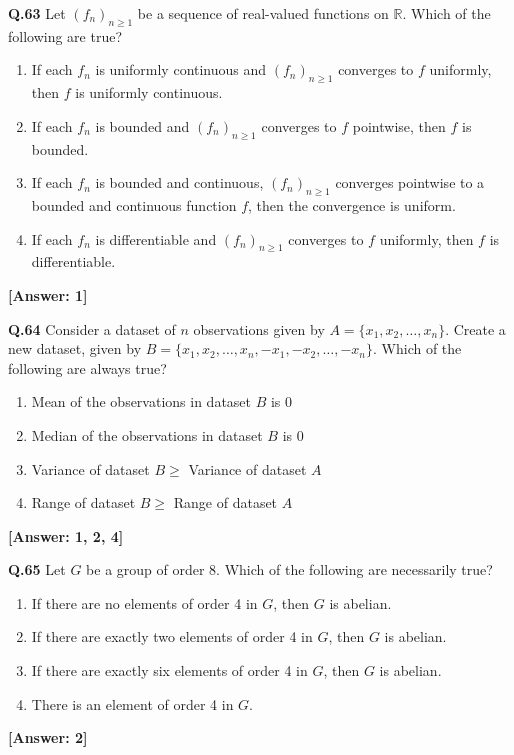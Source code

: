 \documentclass[12pt,a4paper]{article}
\newcommand{\ans}[1]{\quad\textcolor{anscolor}{\textbf{[Answer: #1]}}}
\begin{document}
\textbf{Q.63} Let $(f_n)_{n\ge1}$ be a sequence of real-valued functions on $\mathbb{R}$. Which of the following are true?
\begin{enumerate}[label=\arabic*.]
\item If each $f_n$ is uniformly continuous and $(f_n)_{n\ge1}$ converges to $f$ uniformly, then $f$ is uniformly continuous.
\item If each $f_n$ is bounded and $(f_n)_{n\ge1}$ converges to $f$ pointwise, then $f$ is bounded.
\item If each $f_n$ is bounded and continuous, $(f_n)_{n\ge1}$ converges pointwise to a bounded and continuous function $f$, then the convergence is uniform.
\item If each $f_n$ is differentiable and $(f_n)_{n\ge1}$ converges to $f$ uniformly, then $f$ is differentiable.
\end{enumerate}\ans{1}

\textbf{Q.64} Consider a dataset of $n$ observations given by $A=\{x_1,x_2,\ldots,x_n\}$. Create a new dataset, given by $B=\{x_1,x_2,\ldots,x_n,-x_1,-x_2,\ldots,-x_n\}$. Which of the following are always true?
\begin{enumerate}[label=\arabic*.]
\item Mean of the observations in dataset $B$ is 0
\item Median of the observations in dataset $B$ is 0
\item Variance of dataset $B\ge$ Variance of dataset $A$
\item Range of dataset $B\ge$ Range of dataset $A$
\end{enumerate}\ans{1, 2, 4}

\textbf{Q.65} Let $G$ be a group of order 8. Which of the following are necessarily true?
\begin{enumerate}[label=\arabic*.]
\item If there are no elements of order 4 in $G$, then $G$ is abelian.
\item If there are exactly two elements of order 4 in $G$, then $G$ is abelian.
\item If there are exactly six elements of order 4 in $G$, then $G$ is abelian.
\item There is an element of order 4 in $G$.
\end{enumerate}\ans{2}
\end{document}
